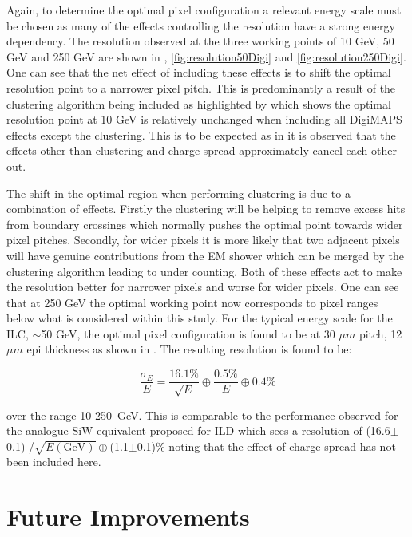 Again, to determine the optimal pixel configuration a relevant energy scale must be chosen as many of the effects controlling the resolution have a strong energy dependency. The resolution observed at the three working points of 10 GeV, 50 GeV and 250 GeV are shown in , \ref{fig:resolution50Digi} and \ref{fig:resolution250Digi}. One can see that the net effect of including these effects is to shift the optimal resolution point to a narrower pixel pitch. This is predominantly a result of the clustering algorithm being included as highlighted by  which shows the optimal resolution point at 10 GeV is relatively unchanged when including all DigiMAPS effects except the clustering. This is to be expected as in  it is observed that the effects other than clustering and charge spread approximately cancel each other out.

The shift in the optimal region when performing clustering is due to a combination of effects. Firstly the clustering will be helping to remove excess hits from boundary crossings which normally pushes the optimal point towards wider pixel pitches. Secondly, for wider pixels it is more likely that two adjacent pixels will have genuine contributions from the EM shower which can be merged by the clustering algorithm leading to under counting. Both of these effects act to make the resolution better for narrower pixels and worse for wider pixels. One can see that at 250 GeV the optimal working point now corresponds to pixel ranges below what is considered within this study. For the typical energy scale for the \ac{ILC}, $\sim$50 GeV, the optimal pixel configuration is found to be at 30 $\mu m$ pitch, 12 $\mu m$ epi thickness as shown in . The resulting resolution is found to be:

\begin{equation}
  \frac{\sigma_E}{E}=\frac{16.1\%}{\sqrt{E}} \oplus \frac{0.5\%}{E} \oplus 0.4\%
\end{equation}

over the range 10-250~GeV. This is comparable to the performance observed for the analogue SiW equivalent proposed for \ac{ILD} which sees a resolution of (16.6$\pm$0.1) /$\sqrt{E(\text{GeV})} \oplus$(1.1$\pm$0.1)\% noting that the effect of charge spread has not been included here.


\section{Future Improvements}

